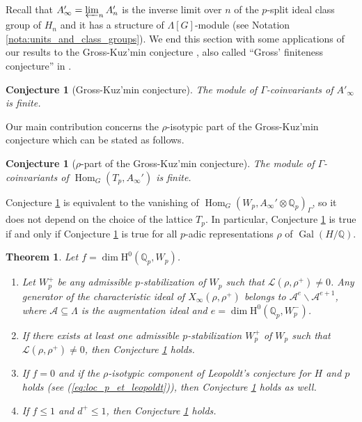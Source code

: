 \documentclass[12pt]{amsart}
\newcommand\bQ{\mathbb{Q}}
\newcommand\Qp{{\mathbb{Q}_p}}
\newcommand\cA{\mathcal{A}}
\newcommand\cL{\mathcal{L}}
\DeclareMathOperator{\Gal}{Gal}
\DeclareMathOperator{\Hom}{Hom}
\newcommand{\HH}{\mathrm{H}}
\theoremstyle{defstyle}
\theoremstyle{thmstyle}
\newtheorem{theorem}[subsubsection]{Theorem}
\newtheorem{conjecture}[subsubsection]{Conjecture}
\begin{document}
Recall that $A_\infty'=\varprojlim_n A_n'$ is the inverse limit over $n$ of the $p$-split ideal class group of $H_n$ and it has a structure of $\Lambda[G]$-module (see Notation \ref{nota:units_and_class_groups}). We end this section with some applications of our results to the Gross-Kuz'min conjecture \cite{kuzmin,gross1981padic}, also called ``Gross' finiteness conjecture'' in \cite[Thm. 1.1]{BKSANT}. \begin{conjecture}[Gross-Kuz'min conjecture]\label{conj:gross_kuzmin_general}
	The module of $\Gamma$-coinvariants of $A'_\infty$ is finite.
\end{conjecture} 
Our main contribution concerns the $\rho$-isotypic part of the Gross-Kuz'min conjecture which can be stated as follows.
\begin{conjecture}[$\rho$-part of the Gross-Kuz'min conjecture]\label{conj:gross_finiteness_conj}
 The module of $\Gamma$-coinvariants of $\Hom_G(T_p,A_\infty')$ is finite.
\end{conjecture}
Conjecture \ref{conj:gross_finiteness_conj} is equivalent to the vanishing of $\Hom_G(W_p,A_\infty' \otimes \Qp)_\Gamma$, so it does not depend on the choice of the lattice $T_p$. In particular, Conjecture \ref{conj:gross_kuzmin_general} is true if and only if Conjecture \ref{conj:gross_finiteness_conj} is true for all $p$-adic representations $\rho$ of $\Gal(H/\bQ)$.
\begin{theorem}\label{thm:exact_order_of_vanishing}
	Let $f=\dim\HH^0(\Qp,W_p)$.
	\begin{enumerate} 
		\item Let $W_p^+$ be any admissible $p$-stabilization of $W_p$ such that $\cL(\rho,\rho^+)\neq 0$. Any generator of the characteristic ideal of $X_\infty(\rho,\rho^+)$ belongs to $\cA^e\backslash \cA^{e+1}$, where $\cA\subseteq \Lambda$ is the augmentation ideal and  $e=\dim \HH^0(\Qp,W_p^-)$. 
		\item If there exists at least one admissible $p$-stabilization $W_p^+$ of $W_p$ such that $\cL(\rho,\rho^+)\neq 0$, then Conjecture \ref{conj:gross_finiteness_conj} holds.
		\item If $f=0$ and if the $\rho$-isotypic component of Leopoldt's conjecture for $H$ and $p$ holds (see (\ref{eq:loc_p_et_leopoldt})), then Conjecture \ref{conj:gross_finiteness_conj} holds as well.
		\item If $f\leq 1$ and $d^+\leq 1$, then Conjecture \ref{conj:gross_finiteness_conj} holds.  
	\end{enumerate}
\end{theorem}
\end{document}
